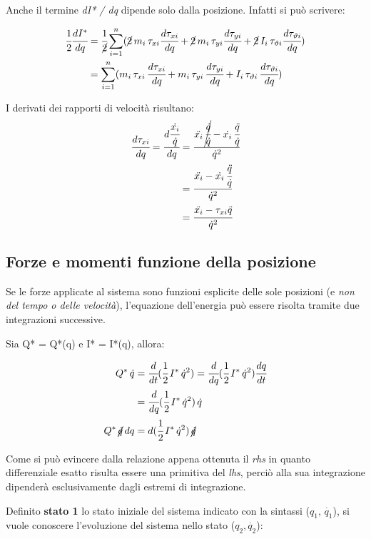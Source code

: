 Anche il termine \emph{dI* / dq} dipende solo dalla posizione. Infatti si può scrivere:

\begin{align*}
\cfrac{1}{2} \cfrac{dI^*}{dq} &= \cfrac{1}{\cancel{2}} \sum_{i=1}^n (\cancel{2}\, m_i\,\tau_{xi}\cfrac{d\tau_{xi}}{dq} + \cancel{2}\, m_i\,\tau_{yi}\cfrac{d\tau_{yi}}{dq} + \cancel{2}\, I_i\,\tau_{\vartheta i}\cfrac{d\tau_{\vartheta i}}{dq})\\
&= \sum_{i=1}^n (m_i\,\tau_{xi}\,\cfrac{d\tau_{xi}}{dq} + m_i\,\tau_{yi}\,\cfrac{d\tau_{yi}}{dq} + I_i\,\tau_{\vartheta i}\,\cfrac{d\tau_{\vartheta i}}{dq})
\end{align*}
	
	I derivati dei rapporti di velocità risultano:
	\begin{align*}
		\cfrac{d\tau_{xi}}{dq} = \cfrac{d\cfrac{\dot{x_i}}{\dot{q}}}{dq} &= \cfrac{\ddot{x_i}\,\cancel{\cfrac{\dot{q}}{\dot{q}}}  - \dot{x_i}\,\cfrac{\ddot{q}}{\dot{q}}}{\dot{q}^2}\\
&= \cfrac{\ddot{x_i} - \dot{x_i}\,\cfrac{\ddot{q}}{\dot{q}}}{\dot{q}^2}\\
&= \cfrac{\ddot{x_i} - \tau_{xi}\ddot{q}}{\dot{q}^2}
	\end{align*}
	
	\subsection{Forze e momenti funzione della posizione}
	
	Se le forze applicate al sistema sono funzioni esplicite delle sole posizioni (e \emph{non del tempo o delle velocità}), l'equazione dell'energia può essere risolta tramite due integrazioni successive.
	
	Sia Q* = Q*(q) e I* = I*(q), allora:
	
	\begin{align*}
	Q^*\,\dot{q} &= \cfrac{d}{dt}(\cfrac{1}{2}\,I^*\,\dot{q}^2) = \cfrac{d}{dq}(\cfrac{1}{2}\,I^*\,\dot{q}^2) \cfrac{dq}{dt}\\
	&= \cfrac{d}{dq}(\cfrac{1}{2}\,I^*\,\dot{q}^2)\,\dot{q}\\
	Q^*\,\cancel{\dot{q}}\, dq &= d (\cfrac{1}{2}\,I^*\,\dot{q}^2)\,\cancel{\dot{q}}
	\end{align*}
	
	Come si può evincere dalla relazione appena ottenuta il \emph{rhs} in quanto differenziale esatto risulta essere una primitiva del \emph{lhs}, perciò alla sua integrazione dipenderà esclusivamente dagli estremi di integrazione.
	
	Definito \textbf{stato 1} lo stato iniziale del sistema indicato con la sintassi ($q_1, \,\dot{q_1}$), si vuole conoscere l'evoluzione del sistema nello stato ($q_2,\dot{q_2}$):
	
